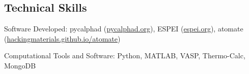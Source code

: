 \documentclass[10pt,letterpaper]{article}
\newenvironment{indentsection}[1]%
{\begin{list}{}%
  {\setlength{\leftmargin}{#1}}%
  \item[]%
}
{\end{list}}
\begin{document}
\subsection*{Technical Skills}

\begin{indentsection}{\parindent}
\begin{description*}
  \item [Software Developed:]
  pycalphad (\href{http://pycalphad.org}{pycalphad.org}),
  ESPEI (\href{http://espei.org}{espei.org}),
  atomate (\href{http://hackingmaterials.github.io/atomate}{hackingmaterials.github.io/atomate})
  \item[Computational Tools and Software:]
  Python, MATLAB, VASP, Thermo-Calc, MongoDB
\end{description*}
\end{indentsection}
\end{document}

